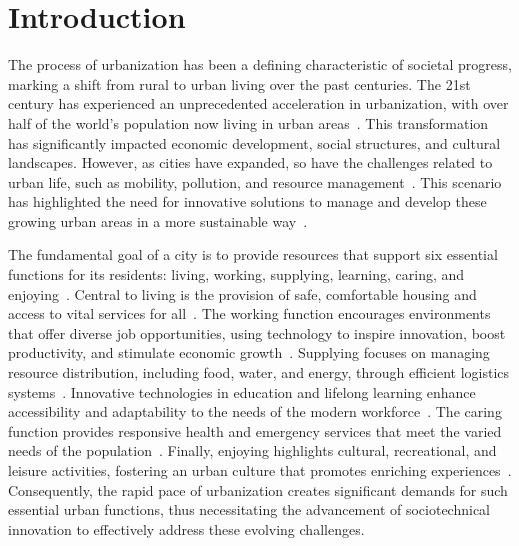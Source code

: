 \documentclass[smartcities,article,submit,pdftex,moreauthors]{Definitions/mdpi}
\begin{document}
\section{Introduction}

The process of urbanization has been a defining characteristic of societal progress, marking a shift from rural to urban living over the past centuries. The 21st century has experienced an unprecedented acceleration in urbanization, with over half of the world's population now living in urban areas~\cite{Randolph2022}. This transformation has significantly impacted economic development, social structures, and cultural landscapes. However, as cities have expanded, so have the challenges related to urban life, such as mobility, pollution, and resource management~\cite{Singh2023,kirimtatFutureTrendsCurrent2020}. This scenario has highlighted the need for innovative solutions to manage and develop these growing urban areas in a more sustainable way~\cite{Tonne2021}. 

The fundamental goal of a city is to provide resources that support six essential functions for its residents: living, working, supplying, learning, caring, and enjoying~\cite{walkfurther15,carlosmoreno15,book15}. Central to living is the provision of safe, comfortable housing and access to vital services for all~\cite{Lukuman2017}. The working function encourages environments that offer diverse job opportunities, using technology to inspire innovation, boost productivity, and stimulate economic growth~\cite{Wolfe2016}. Supplying focuses on managing resource distribution, including food, water, and energy, through efficient logistics systems~\cite{Hu2018}. Innovative technologies in education and lifelong learning enhance accessibility and adaptability to the needs of the modern workforce~\cite{FaneaIvanovici2020}. The caring function provides responsive health and emergency services that meet the varied needs of the population~\cite{PachecoRocha2019}. Finally, enjoying highlights cultural, recreational, and leisure activities, fostering an urban culture that promotes enriching experiences~\cite{Johnson2013}. Consequently, the rapid pace of urbanization creates significant demands for such essential urban functions, thus necessitating the advancement of sociotechnical innovation to effectively address these evolving challenges.
\end{document}
